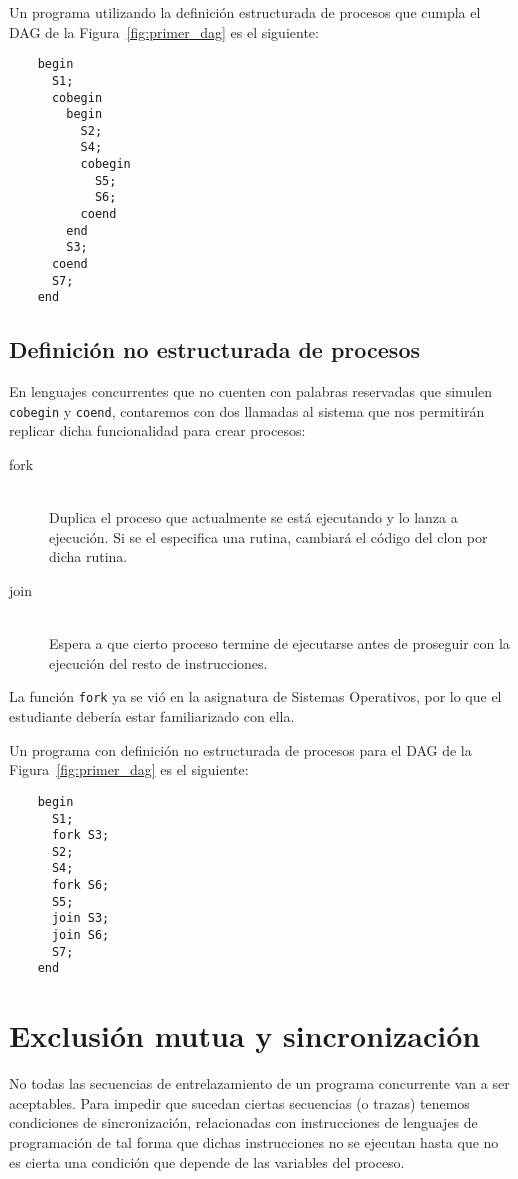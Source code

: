\begin{ejemplo}
    Un programa utilizando la definición estructurada de procesos que cumpla el DAG de la Figura~\ref{fig:primer_dag} es el siguiente:
    \begin{verbatim}
    begin
      S1;
      cobegin
        begin
          S2;
          S4;
          cobegin
            S5;
            S6;
          coend
        end
        S3;
      coend
      S7;
    end
    \end{verbatim}
\end{ejemplo}

\subsection{Definición no estructurada de procesos}
En lenguajes concurrentes que no cuenten con palabras reservadas que simulen \verb|cobegin| y \verb|coend|, contaremos con dos llamadas al sistema que nos permitirán replicar dicha funcionalidad para crear procesos:
\begin{description}
    \item [fork]~\\
        Duplica el proceso que actualmente se está ejecutando y lo lanza a ejecución. Si se el especifica una rutina, cambiará el código del clon por dicha rutina.
    \item [join]~\\
        Espera a que cierto proceso termine de ejecutarse antes de proseguir con la ejecución del resto de instrucciones.
\end{description}
La función \verb|fork| ya se vió en la asignatura de Sistemas Operativos, por lo que el estudiante debería estar familiarizado con ella.

\begin{ejemplo}
    Un programa con definición no estructurada de procesos para el DAG de la Figura~\ref{fig:primer_dag} es el siguiente:
    \begin{verbatim}
    begin        
      S1;
      fork S3;
      S2;
      S4;
      fork S6;
      S5;
      join S3;
      join S6;
      S7;
    end
    \end{verbatim}
\end{ejemplo}

\section{Exclusión mutua y sincronización}
No todas las secuencias de entrelazamiento de un programa concurrente van a ser aceptables. Para impedir que sucedan ciertas secuencias (o trazas) tenemos condiciones de sincronización, relacionadas con instrucciones de lenguajes de programación de tal forma que dichas instrucciones no se ejecutan hasta que no es cierta una condición que depende de las variables del proceso.

